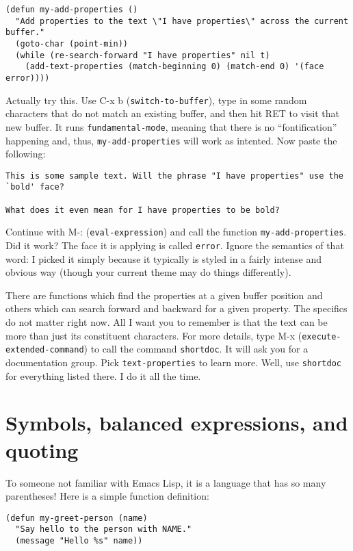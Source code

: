 \documentclass[11pt]{ctexart}
\begin{document}
\begin{verbatim}
(defun my-add-properties ()
  "Add properties to the text \"I have properties\" across the current buffer."
  (goto-char (point-min))
  (while (re-search-forward "I have properties" nil t)
    (add-text-properties (match-beginning 0) (match-end 0) '(face error))))
\end{verbatim}

Actually try this. Use C-x b (\texttt{switch-to-buffer}), type in some random characters that do not match an existing buffer, and then hit RET to visit that new buffer. It runs \texttt{fundamental-mode}, meaning that there is no ``fontification'' happening and, thus, \texttt{my-add-properties} will work as intented. Now paste the following:

\begin{verbatim}
This is some sample text. Will the phrase "I have properties" use the `bold' face?

What does it even mean for I have properties to be bold?
\end{verbatim}

Continue with M-: (\texttt{eval-expression}) and call the function \texttt{my-add-properties}. Did it work? The face it is applying is called \texttt{error}. Ignore the semantics of that word: I picked it simply because it typically is styled in a fairly intense and obvious way (though your current theme may do things differently).

There are functions which find the properties at a given buffer position and others which can search forward and backward for a given property. The specifics do not matter right now. All I want you to remember is that the text can be more than just its constituent characters. For more details, type M-x (\texttt{execute-extended-command}) to call the command \texttt{shortdoc}. It will ask you for a documentation group. Pick \texttt{text-properties} to learn more. Well, use \texttt{shortdoc} for everything listed there. I do it all the time.
\section{Symbols, balanced expressions, and quoting}
\label{sec:org9b7817a}
To someone not familiar with Emacs Lisp, it is a language that has so many parentheses! Here is a simple function definition:

\begin{verbatim}
(defun my-greet-person (name)
  "Say hello to the person with NAME."
  (message "Hello %s" name))
\end{verbatim}
\end{document}
